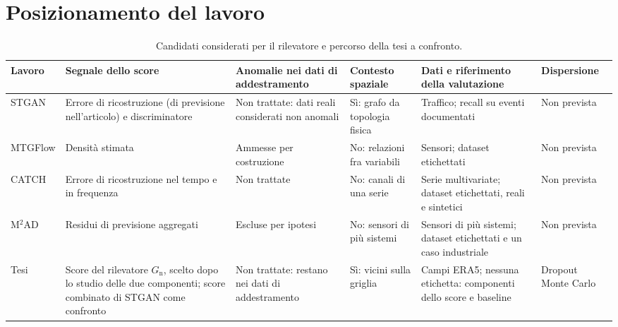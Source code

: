 \section{Posizionamento del lavoro}
\label{sec:posizionamento}

\begin{table}[!t]
    \centering
    \footnotesize
    \setlength{\tabcolsep}{3pt}
    \caption{Candidati considerati per il rilevatore e percorso della tesi a confronto.}
    \label{tab:confronto-rilevatore}
    \vspace{0.6em}
    \begin{tabular}{@{}L{0.12}L{0.16}L{0.16}L{0.14}L{0.19}L{0.13}@{}}
        \toprule
        Lavoro & Segnale dello score & Anomalie nei dati di addestramento & Contesto spaziale & Dati e riferimento della valutazione & Dispersione \\
        \midrule
        STGAN \cite{deng2022stgan} & Errore di ricostruzione (di previsione nell'articolo) e discriminatore & Non trattate: dati reali considerati non anomali & Sì: grafo da topologia fisica & Traffico; recall su eventi documentati & Non prevista \\
        \addlinespace
        MTGFlow \cite{zhou2023labelfree} & Densità stimata & Ammesse per costruzione & No: relazioni fra variabili & Sensori; dataset etichettati & Non prevista \\
        \addlinespace
        CATCH \cite{wu2025catch} & Errore di ricostruzione nel tempo e in frequenza & Non trattate & No: canali di una serie & Serie multivariate; dataset etichettati, reali e sintetici & Non prevista \\
        \addlinespace
        M$^2$AD \cite{alnegheimish2025m2ad} & Residui di previsione aggregati & Escluse per ipotesi & No: sensori di più sistemi & Sensori di più sistemi; dataset etichettati e un caso industriale & Non prevista \\
        \addlinespace
        Tesi & Score del rilevatore $G_{\mathrm{n}}$, scelto dopo lo studio delle due componenti; score combinato di STGAN come confronto & Non trattate: restano nei dati di addestramento & Sì: vicini sulla griglia & Campi ERA5; nessuna etichetta: componenti dello score e baseline & Dropout Monte Carlo \\
        \bottomrule
    \end{tabular}
\end{table}

